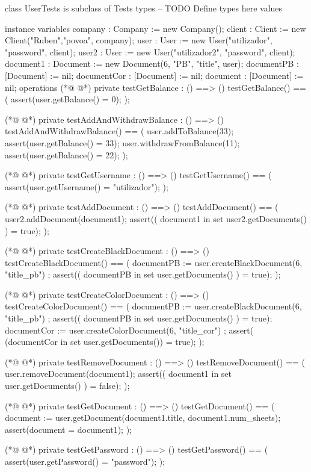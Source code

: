 \begin{vdmpp}[breaklines=true]
class UserTests is subclass of Tests
types
-- TODO Define types here
values

instance variables
company : Company := new Company();
client : Client := new Client("Ruben","povoa", company);
user : User := new User("utilizador", "password", client);
user2 : User := new User("utilizador2", "password", client);
document1 : Document := new Document(6, "PB", "title",  user);
documentPB : [Document] := nil;
documentCor : [Document] := nil;
document : [Document] := nil;
operations
(*@
\label{testGetBalance:16}
@*)
private testGetBalance : () ==> ()
testGetBalance() ==
(
assert(user.getBalance() = 0);
);

(*@
\label{testAddAndWithdrawBalance:22}
@*)
private testAddAndWithdrawBalance : () ==> ()
testAddAndWithdrawBalance() ==
(
user.addToBalance(33);
assert(user.getBalance() = 33);
user.withdrawFromBalance(11);
assert(user.getBalance() = 22);
);

(*@
\label{testGetUsername:31}
@*)
private testGetUsername : () ==> ()
testGetUsername() ==
(
assert(user.getUsername() = "utilizador");
);

(*@
\label{testAddDocument:37}
@*)
private testAddDocument : () ==> ()
testAddDocument() ==
(
user2.addDocument(document1);
assert(( document1 in set user2.getDocuments() ) = true);
);

(*@
\label{testCreateBlackDocument:44}
@*)
private testCreateBlackDocument : () ==> ()
testCreateBlackDocument() ==
(
documentPB := user.createBlackDocument(6, "title_pb") ;
assert(( documentPB in set user.getDocuments() ) = true);
);

(*@
\label{testCreateColorDocument:51}
@*)
private testCreateColorDocument : () ==> ()
testCreateColorDocument() ==
(
documentPB := user.createBlackDocument(6, "title_pb") ;
assert(( documentPB in set user.getDocuments() ) = true);
documentCor := user.createColorDocument(6, "title_cor") ;
assert( (documentCor in set user.getDocuments()) = true);
);

(*@
\label{testRemoveDocument:60}
@*)
private testRemoveDocument : () ==> ()
testRemoveDocument() ==
(
user.removeDocument(document1);
assert(( document1 in set user.getDocuments() ) = false);
);

(*@
\label{testGetDocument:67}
@*)
private testGetDocument : () ==> ()
testGetDocument() == 
(
 document := user.getDocument(document1.title, document1.num_sheets);
 assert(document = document1);
);

(*@
\label{testGetPassword:74}
@*)
private testGetPassword : () ==> ()
testGetPassword() ==
(
assert(user.getPassword() = "password");
);


\end{vdmpp}

